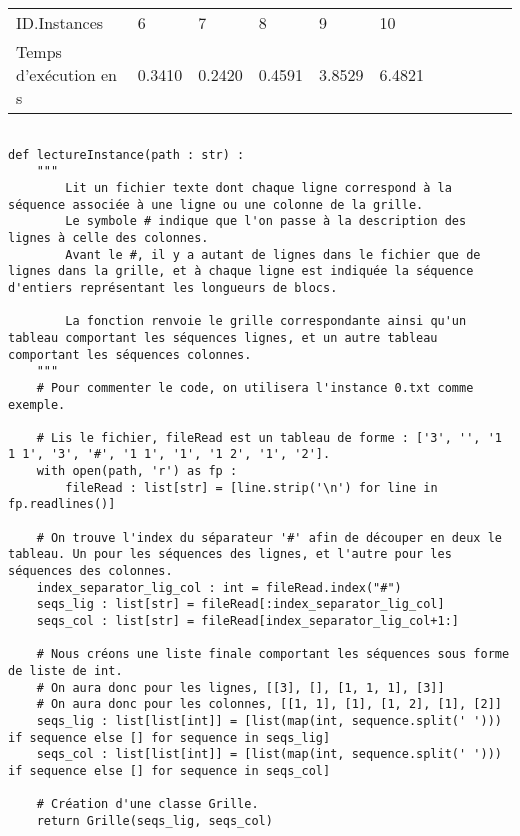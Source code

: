 \documentclass[a4paper,12pt]{article}
\begin{document}
\begin{table}
\centering
\begin{tabular}{|l|l|l|l|l|l|l|l|l|l|l|}
ID.Instances           & 6      & 7      & 8      & 9      & 10      \\
Temps d'exécution en s &  0.3410 & 0.2420 & 0.4591 & 3.8529 & 6.4821 
\end{tabular}
\end{table}

\begin{lstlisting}

def lectureInstance(path : str) :
    """
        Lit un fichier texte dont chaque ligne correspond à la séquence associée à une ligne ou une colonne de la grille.
        Le symbole # indique que l'on passe à la description des lignes à celle des colonnes.
        Avant le #, il y a autant de lignes dans le fichier que de lignes dans la grille, et à chaque ligne est indiquée la séquence d'entiers représentant les longueurs de blocs.
        
        La fonction renvoie le grille correspondante ainsi qu'un tableau comportant les séquences lignes, et un autre tableau comportant les séquences colonnes.
    """
    # Pour commenter le code, on utilisera l'instance 0.txt comme exemple.
    
    # Lis le fichier, fileRead est un tableau de forme : ['3', '', '1 1 1', '3', '#', '1 1', '1', '1 2', '1', '2'].
    with open(path, 'r') as fp :
        fileRead : list[str] = [line.strip('\n') for line in fp.readlines()]
    
    # On trouve l'index du séparateur '#' afin de découper en deux le tableau. Un pour les séquences des lignes, et l'autre pour les séquences des colonnes.
    index_separator_lig_col : int = fileRead.index("#")
    seqs_lig : list[str] = fileRead[:index_separator_lig_col]
    seqs_col : list[str] = fileRead[index_separator_lig_col+1:]
    
    # Nous créons une liste finale comportant les séquences sous forme de liste de int.
    # On aura donc pour les lignes, [[3], [], [1, 1, 1], [3]]
    # On aura donc pour les colonnes, [[1, 1], [1], [1, 2], [1], [2]]
    seqs_lig : list[list[int]] = [list(map(int, sequence.split(' '))) if sequence else [] for sequence in seqs_lig]
    seqs_col : list[list[int]] = [list(map(int, sequence.split(' '))) if sequence else [] for sequence in seqs_col]

    # Création d'une classe Grille.   
    return Grille(seqs_lig, seqs_col)
\end{lstlisting}
\end{document}
